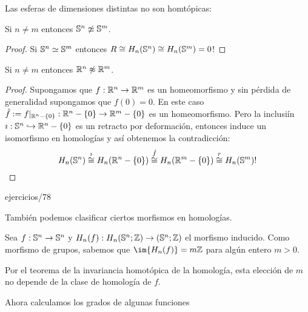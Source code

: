 \documentclass[../../topologia_algebraica]{subfiles}
\begin{document}
Las esferas de dimensiones distintas no son homt\'opicas:

\begin{prop}
  Si $n\neq m$ entonces $\mathbb{S}^n\not\simeq\mathbb{S}^m$.
\end{prop}
\begin{proof}
  Si $\mathbb{S}^n\simeq\mathbb{S}^m$ entonces $R\cong H_n(\mathbb{S}^n)\cong H_n(\mathbb{S}^m)=0$!
\end{proof}

\begin{cor}
  Si $n\neq m$ entonces $\mathbb{R}^n\not\approx\mathbb{R}^m$.
\end{cor}
\begin{proof}
  Supongamos que $f:\mathbb{R}^n\rightarrow\mathbb{R}^m$ es un homeomorfismo y sin p\'erdida de generalidad
  supongamos que $f(0)=0$. En este caso $\hat{f}:=f|_{\mathbb{R}^n-\{0\}}:\mathbb{R}^n-\{0\}\rightarrow\mathbb{R}^m-\{0\}$
  es un homeomorfismo. Pero la inclusi\'in $\imath:\mathbb{S}^n\hookrightarrow\mathbb{R}^n-\{0\}$ es
  un retracto por deformaci\'on, entonces induce un isomorfismo en homolog\'ias y
  as\'i obtenemos la contradicci\'on:
  \[
    H_n(\mathbb{S}^n)\stackrel{\imath}{\cong}
    H_n(\mathbb{R}^n-\{0\})\stackrel{\hat{f}}{\cong}
    H_n(\mathbb{R}^m-\{0\})\stackrel{r}{\cong}
    H_n(\mathbb{S}^m)!
  \]
\end{proof}
{ejercicios/78}%

Tambi\'en podemos clasificar ciertos morfismos en homolog\'ias.

\begin{defin}
  Sea $f:\mathbb{S}^n\rightarrow\mathbb{S}^n$ y $H_n(f):H_n(\mathbb{S}^n;\mathbb{Z})\rightarrow(\mathbb{S}^n;\mathbb{Z})$ el morfismo inducido. Como
  morfismo de grupos, sabemos que $\im{H_n(f)}=m\ZZ$ para alg\'un entero $m>0$.
\end{defin}
\begin{nota}
  Por el
  teorema de la invariancia homot\'opica de la homolog\'ia, esta elecci\'on de $m$ no
  depende de la clase de homolog\'ia de $f$.
\end{nota}

Ahora calculamos los grados de algunas funciones
\end{document}
